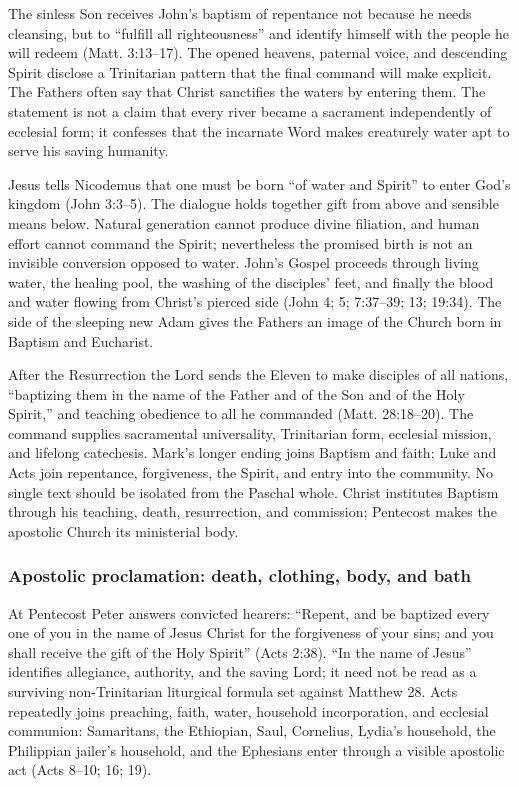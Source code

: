 The sinless Son receives John's baptism of repentance not because he needs cleansing, but to ``fulfill all righteousness'' and identify himself with the people he will redeem (Matt. 3:13--17). The opened heavens, paternal voice, and descending Spirit disclose a Trinitarian pattern that the final command will make explicit. The Fathers often say that Christ sanctifies the waters by entering them. The statement is not a claim that every river became a sacrament independently of ecclesial form; it confesses that the incarnate Word makes creaturely water apt to serve his saving humanity.

Jesus tells Nicodemus that one must be born ``of water and Spirit'' to enter God's kingdom (John 3:3--5). The dialogue holds together gift from above and sensible means below. Natural generation cannot produce divine filiation, and human effort cannot command the Spirit; nevertheless the promised birth is not an invisible conversion opposed to water. John's Gospel proceeds through living water, the healing pool, the washing of the disciples' feet, and finally the blood and water flowing from Christ's pierced side (John 4; 5; 7:37--39; 13; 19:34). The side of the sleeping new Adam gives the Fathers an image of the Church born in Baptism and Eucharist.

After the Resurrection the Lord sends the Eleven to make disciples of all nations, ``baptizing them in the name of the Father and of the Son and of the Holy Spirit,'' and teaching obedience to all he commanded (Matt. 28:18--20). The command supplies sacramental universality, Trinitarian form, ecclesial mission, and lifelong catechesis. Mark's longer ending joins Baptism and faith; Luke and Acts join repentance, forgiveness, the Spirit, and entry into the community. No single text should be isolated from the Paschal whole. Christ institutes Baptism through his teaching, death, resurrection, and commission; Pentecost makes the apostolic Church its ministerial body.

\subsubsection{Apostolic proclamation: death, clothing, body, and bath}

At Pentecost Peter answers convicted hearers: ``Repent, and be baptized every one of you in the name of Jesus Christ for the forgiveness of your sins; and you shall receive the gift of the Holy Spirit'' (Acts 2:38). ``In the name of Jesus'' identifies allegiance, authority, and the saving Lord; it need not be read as a surviving non-Trinitarian liturgical formula set against Matthew 28. Acts repeatedly joins preaching, faith, water, household incorporation, and ecclesial communion: Samaritans, the Ethiopian, Saul, Cornelius, Lydia's household, the Philippian jailer's household, and the Ephesians enter through a visible apostolic act (Acts 8--10; 16; 19).

